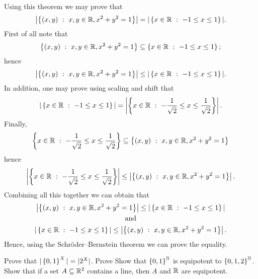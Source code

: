 Using this theorem we may prove that 
\[
  \left|
    \set[x, y \in \R, x^2 + y^2 = 1]{(x, y)}
  \right| = |\set[-1 \le x \le 1]{x \in \R}|.
\]
First of all note that 
\[
  \set[x, y \in \R, x^2 + y^2 = 1]{(x, y)}
  \subseteq \set[-1 \le x \le 1]{x \in \R};
\]
hence
\[
  \left|
    \set[x, y \in \R, x^2 + y^2 = 1]{(x, y)}
  \right| \le |\set[-1 \le x \le 1]{x \in \R}|.
\]
In addition, one may prove using scaling and shift that
\[
  |\set[-1 \le x \le 1]{x \in \R}| = 
  \left|
    \set[-\frac{1}{\sqrt{2}} \le x \le \frac{1}{\sqrt{2}}]{x \in \R}
  \right|.
\]
Finally, 
\[
  \set[-\frac{1}{\sqrt{2}} \le x \le \frac{1}{\sqrt{2}}]{x \in \R}
  \subseteq 
  \set[x, y \in \R, x^2 + y^2 = 1]{(x, y)}
\]
hence
\[
  \left|
    \set[-\frac{1}{\sqrt{2}} \le x \le \frac{1}{\sqrt{2}}]{x \in \R}
  \right|
  \le
  \left|
    \set[x, y \in \R, x^2 + y^2 = 1]{(x, y)}
  \right|.
\]
Combining all this together we can obtain that
\begin{gather*}
  \left|
    \set[x, y \in \R, x^2 + y^2 = 1]{(x, y)}
  \right| \le |\set[-1 \le x \le 1]{x \in \R}| \\
  \text{and}\\
  |\set[-1 \le x \le 1]{x \in \R}| \le
  \left|
    \set[x, y \in \R, x^2 + y^2 = 1]{(x, y)}
  \right|.
\end{gather*}
Hence, using the Schr\"{o}der–Bernstein theorem we can prove the equality.

\begin{chapterendexercises}
    \exercise[recommended] Prove that $|\set{0, 1}^X| = |2^X|$.
    \exercise[recommended] Prove 
    \exercise Show that $\set{0, 1}^\N$ is equipotent to $\set{0, 1, 2}^\N$.
    \exercise Show that if a set $A \subseteq {\mathbb{R}}^2$ contains a line, then $A$
      and ${\mathbb{R}}$ are equipotent.
\end{chapterendexercises}
